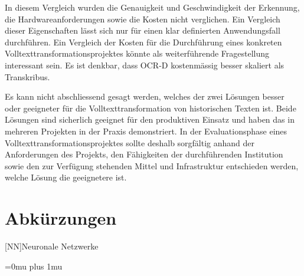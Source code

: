 \documentclass[a4paper,oneside, 12pt]{report}
\begin{document}
In diesem Vergleich wurden die Genauigkeit und Geschwindigkeit der Erkennung, die Hardwareanforderungen sowie die Kosten nicht verglichen. Ein Vergleich dieser Eigenschaften lässt sich nur für einen klar definierten Anwendungsfall durchführen. Ein Vergleich der Kosten für die Durchführung eines konkreten Volltexttransformationsprojektes könnte als weiterführende Fragestellung interessant sein. Es ist denkbar, dass OCR-D kostenmässig besser skaliert als Transkribus.

Es kann nicht abschliessend gesagt werden, welches der zwei Lösungen besser oder geeigneter für die Volltexttransformation von historischen Texten ist. Beide Lösungen sind sicherlich geeignet für den produktiven Einsatz und haben das in mehreren Projekten in der Praxis demonstriert. In der Evaluationsphase eines Volltexttransformationsprojektes sollte deshalb sorgfältig anhand der Anforderungen des Projekts, den Fähigkeiten der durchführenden Institution sowie den zur Verfügung stehenden Mittel und Infrastruktur entschieden werden, welche Lösung die geeignetere ist.





\cleardoublepage
{}
{}
\chapter*{Abkürzungen}
\begin{acronym}[Abkürzungen]
    [NN]{Neuronale Netzwerke}
\end{acronym}

\cleardoublepage
{}
{}
\Urlmuskip=0mu plus 1mu\relax
\end{document}
